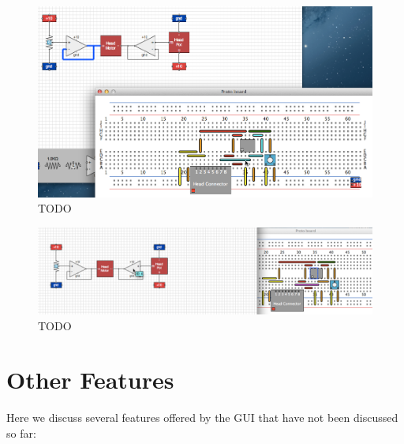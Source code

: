 \begin{figure}
\begin{center}
\includegraphics[width=\textwidth]{Images/gui_wire_highlight.png}
\caption{TODO}
\label{fig:wire_highlight}
\end{center}
\end{figure}

\begin{figure}
\begin{center}
\includegraphics[width=\textwidth]{Images/gui_component_highlight.png}
\caption{TODO}
\label{fig:component_highlight}
\end{center}
\end{figure}

\section{Other Features}

Here we discuss several features offered by the GUI that have not been discussed
so far:

